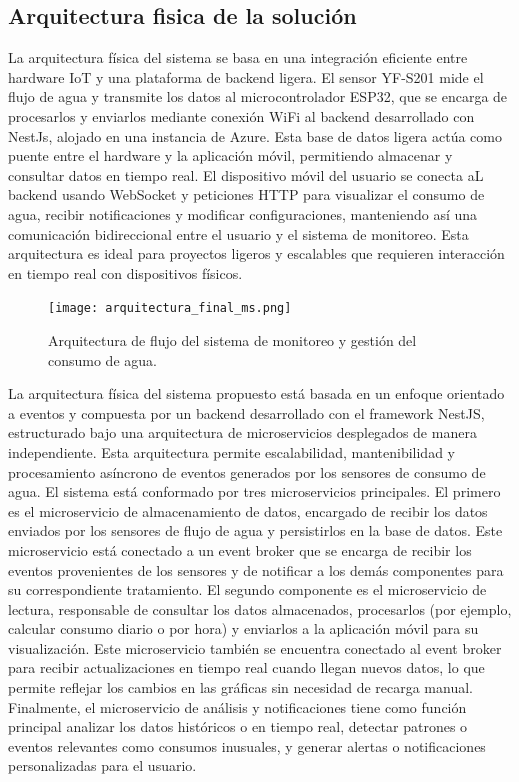 \documentclass[conference]{IEEEtran}
\begin{document}
\subsection*{\textbf{Arquitectura fisica de la solución}}
La arquitectura física del sistema se basa en una integración eficiente entre hardware IoT y una plataforma de backend ligera. El sensor YF-S201 mide el flujo de agua y transmite los datos al microcontrolador ESP32, que se encarga de procesarlos y enviarlos mediante conexión WiFi al backend desarrollado con NestJs, alojado en una instancia de Azure. Esta base de datos ligera actúa como puente entre el hardware y la aplicación móvil, permitiendo almacenar y consultar datos en tiempo real. El dispositivo móvil del usuario se conecta aL backend usando WebSocket y peticiones HTTP para visualizar el consumo de agua, recibir notificaciones y modificar configuraciones, manteniendo así una comunicación bidireccional entre el usuario y el sistema de monitoreo. Esta arquitectura es ideal para proyectos ligeros y escalables que requieren interacción en tiempo real con dispositivos físicos.
\begin{figure}[!htbp]
\centerline{\texttt{[image: arquitectura\_final\_ms.png]}}
\caption{Arquitectura de flujo del sistema de monitoreo y gestión del consumo de agua.}
    
\end{figure}

La arquitectura física del sistema propuesto está basada en un enfoque orientado a eventos y compuesta por un backend desarrollado con el framework NestJS, estructurado bajo una arquitectura de microservicios desplegados de manera independiente. Esta arquitectura permite escalabilidad, mantenibilidad y procesamiento asíncrono de eventos generados por los sensores de consumo de agua. El sistema está conformado por tres microservicios principales. El primero es el microservicio de almacenamiento de datos, encargado de recibir los datos enviados por los sensores de flujo de agua y persistirlos en la base de datos. Este microservicio está conectado a un event broker que se encarga de recibir los eventos provenientes de los sensores y de notificar a los demás componentes para su correspondiente tratamiento. El segundo componente es el microservicio de lectura, responsable de consultar los datos almacenados, procesarlos (por ejemplo, calcular consumo diario o por hora) y enviarlos a la aplicación móvil para su visualización. Este microservicio también se encuentra conectado al event broker para recibir actualizaciones en tiempo real cuando llegan nuevos datos, lo que permite reflejar los cambios en las gráficas sin necesidad de recarga manual. Finalmente, el microservicio de análisis y notificaciones tiene como función principal analizar los datos históricos o en tiempo real, detectar patrones o eventos relevantes como consumos inusuales, y generar alertas o notificaciones personalizadas para el usuario.
\end{document}
